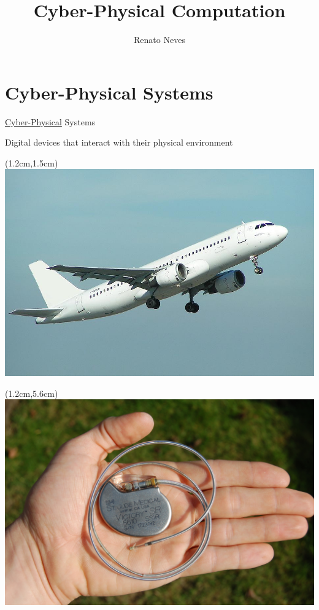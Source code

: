 \documentclass{beamer}
\author[Renato Neves]{Renato Neves}
\date{}
\begin{document}
\title{Cyber-Physical Computation}

\frame[plain]{\titlepage}

\section{Cyber-Physical Systems}

\begin{frame}{\underline{Cyber-Physical} Systems}

\begin{center}
  \small{\alert{Digital} devices that interact with their \alert{physical} environment}
\end{center}
  
\begin{textblock*}{5cm}(1.2cm,1.5cm)
\includegraphics[scale=0.205]{Images/aviao.jpg} 
\end{textblock*}


\begin{textblock*}{5cm}(1.2cm,5.6cm)
\includegraphics[scale=0.2]{Images/pace.jpg} 
\end{textblock*}



\end{frame}
\end{document}
